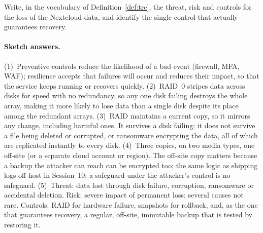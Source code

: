 \begin{exercise}
Write, in the vocabulary of Definition~\ref{def:trc}, the threat, risk and
controls for the loss of the Nextcloud data, and identify the single control
that actually guarantees recovery.
\end{exercise}

\paragraph{Sketch answers.}
{\small
(1)~Preventive controls reduce the likelihood of a bad event (firewall, MFA,
WAF); resilience accepts that failures will occur and reduces their impact,
so that the service keeps running or recovers quickly. (2)~RAID~0 stripes
data across disks for speed with no redundancy, so any one disk failing
destroys the whole array, making it more likely to lose data than a single
disk despite its place among the redundant arrays. (3)~RAID maintains a
current copy, so it mirrors any change, including harmful ones. It survives a
disk failing; it does not survive a file being deleted or corrupted, or
ransomware encrypting the data, all of which are replicated instantly to every
disk. (4)~Three copies, on two media types, one off-site (or a separate cloud
account or region). The off-site copy matters because a backup the attacker
can reach can be encrypted too; the same logic as shipping logs off-host in
Session~10: a safeguard under the attacker's control is no safeguard.
(5)~Threat: data lost through disk failure, corruption, ransomware or
accidental deletion. Risk: severe impact of permanent loss; several causes not
rare. Controls: RAID for hardware failure, snapshots for rollback, and, as the
one that guarantees recovery, a regular, off-site, immutable backup that is
tested by restoring it.}


